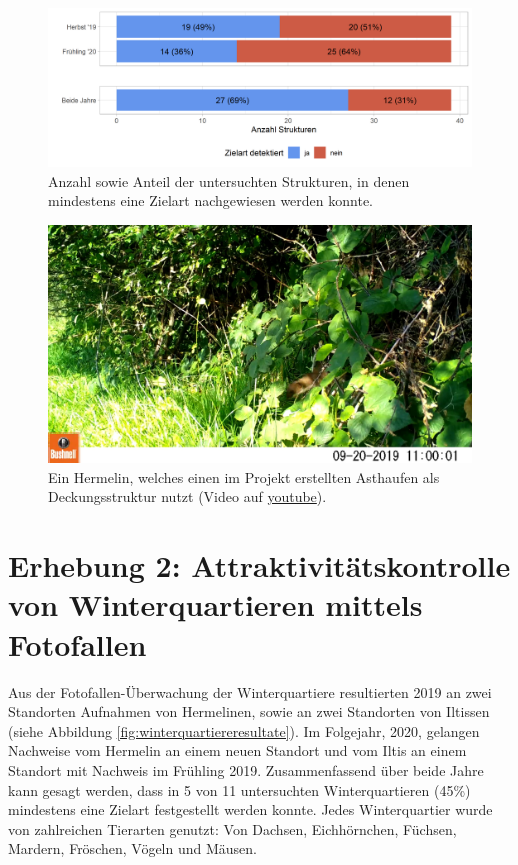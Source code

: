 \documentclass[
]{scrbook}
\begin{document}
\begin{figure}
\includegraphics[width=1\linewidth]{images/strukturen_mit_zielart} \caption{Anzahl sowie Anteil der untersuchten Strukturen, in denen mindestens eine Zielart nachgewiesen werden konnte.}\label{fig:strukturenmitzielart}
\end{figure}



\begin{figure}
\includegraphics[width=1\linewidth]{images/str196/capture} \caption{Ein Hermelin, welches einen im Projekt erstellten Asthaufen als Deckungsstruktur nutzt (Video auf \href{https://youtu.be/4gVpcvPIrNA}{youtube}).}\label{fig:hermelinstr196}
\end{figure}

\hypertarget{erhebung-2-attraktivituxe4tskontrolle-von-winterquartieren-mittels-fotofallen-1}{%
\section{Erhebung 2: Attraktivitätskontrolle von Winterquartieren mittels Fotofallen}\label{erhebung-2-attraktivituxe4tskontrolle-von-winterquartieren-mittels-fotofallen-1}}

Aus der Fotofallen-Überwachung der Winterquartiere resultierten 2019 an zwei Standorten Aufnahmen von Hermelinen, sowie an zwei Standorten von Iltissen (siehe Abbildung \ref{fig:winterquartiereresultate}). Im Folgejahr, 2020, gelangen Nachweise vom Hermelin an einem neuen Standort und vom Iltis an einem Standort mit Nachweis im Frühling 2019. Zusammenfassend über beide Jahre kann gesagt werden, dass in 5 von 11 untersuchten Winterquartieren (45\%) mindestens eine Zielart festgestellt werden konnte. Jedes Winterquartier wurde von zahlreichen Tierarten genutzt: Von Dachsen, Eichhörnchen, Füchsen, Mardern, Fröschen, Vögeln und Mäusen.
\end{document}
